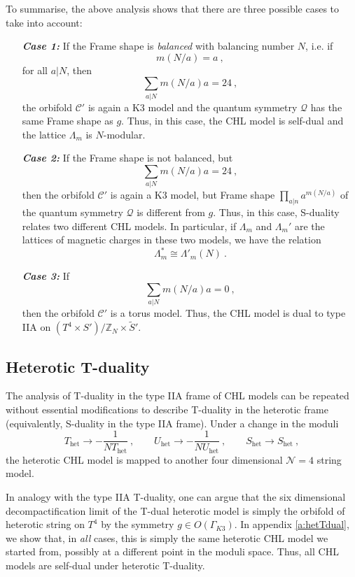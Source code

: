\documentclass[a4paper,11pt]{article}
\newcommand{\ZZ}{\mathbb{Z}}
\newcommand{\C}{\mathcal{C}}
\newcommand{\N}{\mathcal{N}}
\newcommand{\Q}{\mathcal{Q}}
\numberwithin{equation}{section}
\def\be{\begin{equation}}
\def\ee{\end{equation}}
\begin{document}
To summarise, the above analysis shows that there are three possible cases to take into account:
\begin{itemize}
\item[\bf \emph{Case 1:}] If the Frame shape is \emph{balanced} with balancing number $N$, i.e. if
\be m(N/a)=a\ ,
\ee for all $a|N$, then 
\be \sum_{a|N}m(N/a)a=24\ ,\ee
the orbifold $\C'$ is again a K3 model and the quantum symmetry $\Q$ has the same Frame shape as $g$. Thus, in this case, the CHL model is self-dual and the lattice $\Lambda_m$ is $N$-modular.
\item[\bf \emph{Case 2:}] If the Frame shape is not balanced, but
\be \sum_{a|N}m(N/a)a=24\ ,
\ee then the orbifold $\C'$ is again a K3 model, but Frame shape $\prod_{a|n}a^{m(N/a)}$ of the quantum symmetry $\Q$ is different from $g$. Thus, in this case, S-duality relates two different CHL models. In particular, if $\Lambda_m$ and $\Lambda_m'$ are the lattices of magnetic charges in these two models, we have the relation
\be \Lambda_m^*\cong\Lambda'_m(N)\ .
\ee
\item[\bf \emph{Case 3:}] If
\be \sum_{a|N}m(N/a)a=0\ ,
\ee then the orbifold $\C'$ is a torus model. Thus, the CHL model is dual to type IIA on $(T^4\times S')/\ZZ_N\times \tilde S'$.
\end{itemize}

\subsection{Heterotic T-duality}\label{s:hetTdual}

The analysis of T-duality in the type IIA frame of CHL models can be repeated without essential modifications to describe T-duality in the heterotic frame (equivalently, S-duality in the type IIA frame). Under a change in the moduli
\be T_{\text{het}}\to -\frac{1}{NT_{\text{het}}}\ ,\qquad U_{\text{het}}\to -\frac{1}{NU_{\text{het}}}\ , \qquad S_{\text{het}}\to S_{\text{het}}\ ,
\ee the heterotic CHL model is mapped to another four dimensional $\N=4$ string model. 

In analogy with the type IIA T-duality, one can argue that the six dimensional decompactification limit of the T-dual heterotic model is simply the orbifold of heterotic string on $T^4$ by the symmetry $g\in O(\Gamma_{K3})$. In appendix \ref{a:hetTdual}, we show that, in \emph{all} cases, this is simply the same heterotic CHL model we started from, possibly at a different point in the moduli space. Thus, all CHL models are self-dual under heterotic T-duality.
\end{document}
